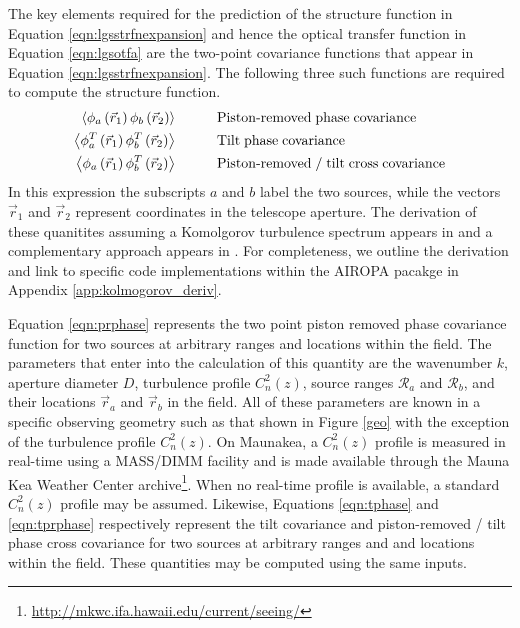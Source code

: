 The key elements required for the prediction of the structure function
in Equation \ref{eqn:lgsstrfnexpansion} and hence the optical transfer
function in Equation \ref{eqn:lgsotfa} are the two-point covariance
functions that appear in Equation \ref{eqn:lgsstrfnexpansion}.  The
following three such functions are required to compute the structure
function.
\begin{align}
\left\langle \phi_{a}\left(\vec{r}_{1}\right) \phi_{b}\left(\vec{r}_{2}\right) \right\rangle &\quad\quad\quad {\rm Piston\text{-}removed\;phase\;covariance} \label{eqn:prphase} \\
\left\langle \phi^{T}_{a}\left(\vec{r}_{1}\right) \phi^{T}_{b}\left(\vec{r}_{2}\right) \right\rangle &\quad\quad\quad {\rm Tilt\;phase\;covariance} \label{eqn:tphase} \\
\left\langle \phi_{a}\left(\vec{r}_{1}\right) \phi^{T}_{b}\left(\vec{r}_{2}\right) \right\rangle &\quad\quad\quad {\rm Piston\text{-}removed\;/\;tilt\;cross\;covariance} \label{eqn:tprphase} 
\end{align}
In this expression the subscripts $a$ and $b$ label the two sources,
while the vectors $\vec{r}_{1}$ and $\vec{r}_{2}$
represent coordinates in the telescope aperture.  
The derivation of these quanitites assuming a Komolgorov
turbulence spectrum appears in
\cite{Tyler:1994a} and a complementary approach appears in 
\cite{Sasiela:2012}.
For completeness, we outline the derivation and 
link to specific code implementations within the AIROPA
pacakge in Appendix \ref{app:kolmogorov_deriv}. 


Equation \ref{eqn:prphase} represents the two point piston removed
phase covariance function for two sources at arbitrary ranges and
locations within the field.  The parameters that enter into the
calculation of this quantity are the wavenumber $k$, aperture diameter
$D$, turbulence profile $C_{n}^{2}(z)$, source ranges
$\mathcal{R}_{a}$ and $\mathcal{R}_{b}$, and their locations
$\vec{r}_{a}$ and $\vec{r}_{b}$ in the field.  All of
these parameters are known in a specific observing geometry such as
that shown in Figure \ref{geo} with the exception of the turbulence
profile $C_{n}^{2}(z)$.  
On Maunakea, a $C_{n}^{2}(z)$ profile is measured in real-time
using a MASS/DIMM facility and is made available through the Mauna Kea Weather
Center archive\footnote{\url{http://mkwc.ifa.hawaii.edu/current/seeing/}}. 
When no real-time profile is available, 
a standard $C_{n}^{2}(z)$ profile may be assumed.  Likewise,
Equations \ref{eqn:tphase} and \ref{eqn:tprphase} respectively represent
the tilt covariance and piston-removed / tilt phase cross covariance
for two sources at arbitrary ranges and and locations within the
field.  These quantities may be computed using the same inputs.

